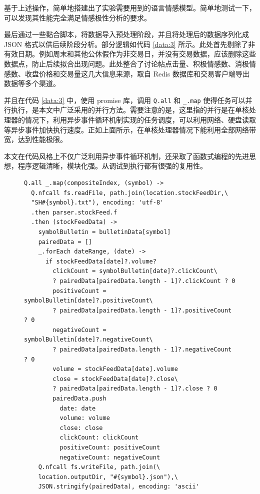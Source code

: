 基于上述操作，简单地搭建出了实验需要用到的语言情感模型。简单地测试一下，可以发现其性能完全满足情感极性分析的要求。

最后通过一些黏合脚本，将数据导入预处理阶段，并且将处理后的数据序列化成 JSON 格式以供后续阶段分析。部分逻辑如代码 \ref{data:3} 所示。此处首先剔除了非有效日期。例如周末和其他公休假作为非交易日，并没有交易数据，应该删除这些数据点，防止后续拟合出现问题。此处整合了讨论帖点击量、积极情感数、消极情感数、收盘价格和交易量这几大信息来源，取自 Redis 数据库和交易客户端导出数据等多个渠道。

并且在代码 \ref{data:3} 中，使用 promise 库，调用 \texttt{Q.all} 和 \texttt{\_.map} 使得任务可以并行执行，是本文中广泛采用的并行方法。需要注意的是，这里指的并行是在单核处理器的情况下，利用异步事件循环机制实现的任务调度，可以利用网络、硬盘读取等异步事件加快执行速度。正如上面所示，在单核处理器情况下能利用全部网络带宽，达到性能极限。

本文在代码风格上不仅广泛利用异步事件循环机制，还采取了函数式编程的先进思想，程序逻辑清晰，模块化强。从调试到执行都有很强的复用性。

\begin{figure}
  \begin{minipage}{\textwidth}
    \begin{lstlisting}[caption=数据组合, label=data:3]
Q.all _.map(compositeIndex, (symbol) ->
  Q.nfcall fs.readFile, path.join(location.stockFeedDir,\
  "SH#{symbol}.txt"), encoding: 'utf-8'
  .then parser.stockFeed.f
  .then (stockFeedData) ->
    symbolBulletin = bulletinData[symbol]
    pairedData = []
    _.forEach dateRange, (date) ->
      if stockFeedData[date]?.volume?
        clickCount = symbolBulletin[date]?.clickCount\
        ? pairedData[pairedData.length - 1]?.clickCount ? 0
        positiveCount = symbolBulletin[date]?.positiveCount\
        ? pairedData[pairedData.length - 1]?.positiveCount ? 0
        negativeCount = symbolBulletin[date]?.negativeCount\
        ? pairedData[pairedData.length - 1]?.negativeCount ? 0
        volume = stockFeedData[date].volume
        close = stockFeedData[date]?.close\
        ? pairedData[pairedData.length - 1]?.close ? 0
        pairedData.push
          date: date
          volume: volume
          close: close
          clickCount: clickCount
          positiveCount: positiveCount
          negativeCount: negativeCount
    Q.nfcall fs.writeFile, path.join(\
    location.outputDir, "#{symbol}.json"),\
    JSON.stringify(pairedData), encoding: 'ascii'
    \end{lstlisting}
  \end{minipage}
\end{figure}

